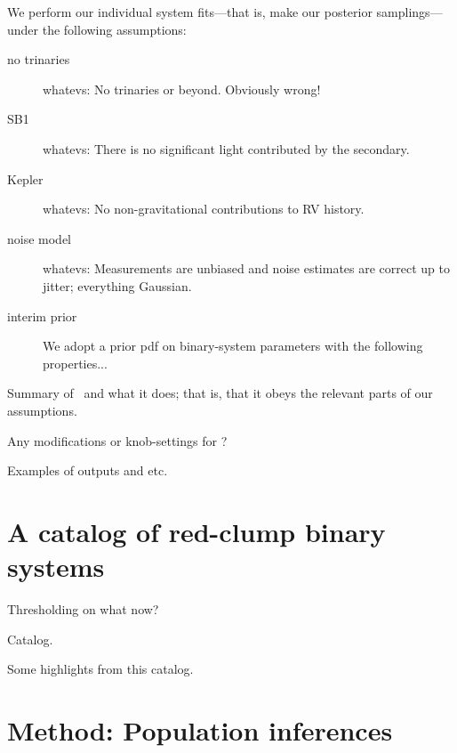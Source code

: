 \documentclass[modern, letterpaper]{aastex61}
\newcommand{\thejoker}{\project{The~Joker}}
\begin{document}
We perform our individual system fits---that is, make our posterior
samplings---under the following assumptions:
\begin{description}
\item[no trinaries] whatevs: No trinaries or beyond. Obviously wrong!
\item[SB1] whatevs: There is no significant light contributed by the secondary.
\item[Kepler] whatevs: No non-gravitational contributions to RV history.
\item[noise model] whatevs: Measurements are unbiased and noise estimates are correct up to jitter; everything Gaussian.
\item[interim prior] We adopt a prior pdf on binary-system parameters
  with the following properties...
\end{description}

Summary of \thejoker\ and what it does; that is, that it obeys the
relevant parts of our assumptions.

Any modifications or knob-settings for \thejoker?

Examples of outputs and etc.

\section{A catalog of red-clump binary systems}

Thresholding on what now?

Catalog.

Some highlights from this catalog.

\section{Method: Population inferences}\label{sec:popinference}
\end{document}
